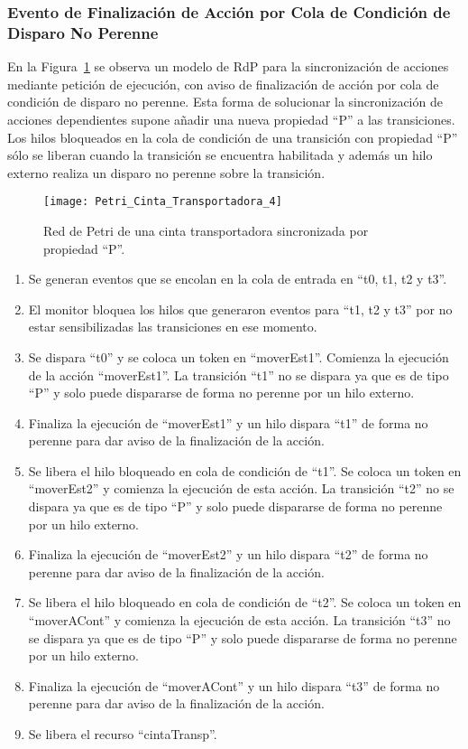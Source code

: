 \subsubsection{Evento de Finalización de Acción por Cola de Condición de
Disparo No Perenne}
En la Figura~\ref{fig:petri_cinta_transportadora_4} se observa un modelo de
RdP para la sincronización de acciones mediante petición de ejecución, con aviso
de finalización de acción por cola de condición de disparo no perenne. 
Esta forma de solucionar la sincronización de acciones dependientes
supone añadir una nueva propiedad ``P'' a las transiciones. Los hilos
bloqueados en la cola de condición de una transición con propiedad ``P'' sólo
se liberan cuando la transición se encuentra habilitada y además un hilo
externo realiza un disparo no perenne sobre la transición.

\begin{figure}[H]
    \centering
    \texttt{[image: Petri\_Cinta\_Transportadora\_4]}
    \caption{Red de Petri de una cinta transportadora sincronizada por
    propiedad ``P''.}
    \label{fig:petri_cinta_transportadora_4}
\end{figure}

\begin{enumerate}
    \item Se generan eventos que se encolan en la cola de entrada en “t0, t1,
    t2 y t3”.
	\item El monitor bloquea los hilos que generaron eventos para “t1, t2 y t3” por
	no estar sensibilizadas las transiciones en ese momento.
	\item Se dispara ``t0'' y se coloca un token en ``moverEst1''. Comienza la
	ejecución de la acción ``moverEst1''. La transición ``t1'' no se dispara ya que
	es de tipo ``P'' y solo puede dispararse de forma no perenne por un hilo
	externo.
	\item Finaliza la ejecución de ``moverEst1'' y un hilo dispara ``t1'' de forma
	no perenne para dar aviso de la finalización de la acción.
	\item Se libera el hilo bloqueado en cola de condición de ``t1''. Se coloca un
	token en ``moverEst2'' y comienza la ejecución de esta acción. La transición
	``t2'' no se dispara ya que es de tipo ``P'' y solo puede dispararse de forma
	no perenne por un hilo externo.
	\item Finaliza la ejecución de ``moverEst2'' y un hilo dispara ``t2'' de forma
	no perenne para dar aviso de la finalización de la acción.
	\item  Se libera el hilo bloqueado en cola de condición de ``t2''. Se coloca un
	token en ``moverACont'' y comienza la ejecución de esta acción. La transición
	``t3'' no se dispara ya que es de tipo ``P'' y solo puede dispararse de forma
	no perenne por un hilo externo.
	\item Finaliza la ejecución de ``moverACont'' y un hilo dispara ``t3'' de forma
	no perenne para dar aviso de la finalización de la acción.
	\item Se libera el recurso ``cintaTransp''.
\end{enumerate}

